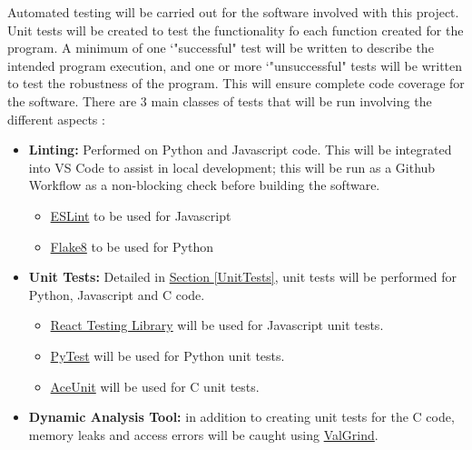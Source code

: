 \documentclass[12pt, titlepage]{article}
\begin{document}
Automated testing will be carried out for the software involved with this project. Unit tests will be created to test the 
functionality fo each function created for the program. A minimum of one `"successful" test will be written to describe the 
intended program execution, and one or more `"unsuccessful" tests will be written to test the robustness of the program. 
This will ensure complete code coverage for the software. There are 3 main classes of tests that will be run involving the different aspects \progname{}:
\begin{itemize}
  \item \textbf{Linting:} Performed on Python and Javascript code. This will be integrated into VS Code to assist in local development; this will be run as a Github Workflow as a non-blocking check before building the software.

    \begin{itemize}
      \item \href{https://marketplace.visualstudio.com/items?itemName=dbaeumer.vscode-eslint}{ESLint} to be used for Javascript
      \item \href{https://marketplace.visualstudio.com/items?itemName=ms-python.flake8}{Flake8} to be used for Python
    \end{itemize}

  \item \textbf{Unit Tests:} Detailed in \hyperref[UnitTests]{Section \ref*{UnitTests}}, unit tests will be performed for Python, Javascript and C code.
    \begin{itemize}
      \item \href{https://github.com/testing-library/react-testing-library}{React Testing Library} will be used for Javascript unit tests.
      \item \href{https://docs.pytest.org/en/7.2.x/}{PyTest} will be used for Python unit tests.
      \item \href{https://aceunit.sourceforge.net/}{AceUnit} will be used for C unit tests.
    \end{itemize}

  \item \textbf{Dynamic Analysis Tool:} in addition to creating unit tests for the C code, memory leaks and access errors will be caught using \href{https://valgrind.org/}{ValGrind}.
  
\end{itemize}
\end{document}
